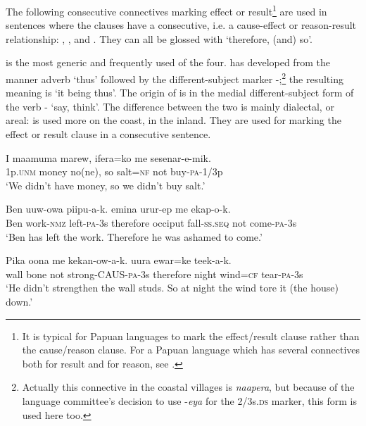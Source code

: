 The following consecutive connectives marking effect or result\footnote{It is typical for Papuan languages to mark the effect/result clause rather than the cause/reason clause. For a Papuan language which has several connectives both for result and for reason, see \citet[267--273]{Farr1999}.} are used in sentences where the clauses have a consecutive, i.e. a cause-effect or reason-result relationship: , , and . They can all be glossed with `therefore, (and) so'.

 is the most generic and frequently used of the four.  has developed from the manner adverb  `thus' followed by the different-subject marker -;\footnote{Actually this connective in the coastal villages is \textit{naapera}, but because of the language committee's decision to use -\textit{eya} for the 2/3s.\textsc{ds} marker, this form is used here too.} the resulting meaning is `it being thus'. The origin of  is in the medial different-subject form of the verb - `say, think'. The difference between the two is mainly dialectal, or areal:  is used more on the coast,  in the inland. They are used for marking the effect or result clause in a consecutive sentence. 

\ea%
\label{ex:x731}
\gll I maamuma marew,  ifera=ko me sesenar-e-mik. \\
1p.\textsc{unm} money no(ne), so salt=\textsc{nf} not buy-\textsc{pa}-1/3p\\
\glt`We didn't have money, so we didn't buy salt.'
\z

\ea%
\label{ex:x732}
\gll Ben uuw-owa piipu-a-k.  emina urur-ep me ekap-o-k.\\
Ben work-\textsc{nmz} left-\textsc{pa}-3s therefore occiput fall-\textsc{ss}.\textsc{seq} not come-\textsc{pa}-3s\\
\glt`Ben has left the work. Therefore he was ashamed to come.'
\z

\ea%
\label{ex:x735}
\gll Pika oona me kekan-ow-a-k.  uura ewar=ke teek-a-k.\\
wall bone not strong-CAUS-\textsc{pa}-3s therefore night wind=\textsc{cf} tear-\textsc{pa}-3s\\
\glt`He didn't strengthen the wall studs. So at night the wind tore it (the house) down.'
\z

